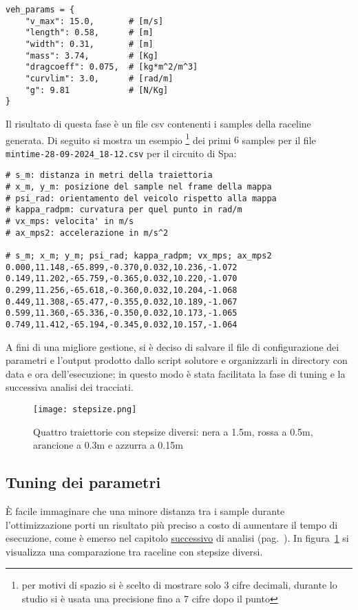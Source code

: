 \begin{lstlisting}
veh_params = {
	"v_max": 15.0,       # [m/s]
	"length": 0.58,      # [m]
	"width": 0.31,       # [m]
	"mass": 3.74,        # [Kg]
	"dragcoeff": 0.075,  # [kg*m^2/m^3]
	"curvlim": 3.0,      # [rad/m]
	"g": 9.81            # [N/Kg]
}
\end{lstlisting}
\newpage
\noindent Il risultato di questa fase è un file csv contenenti i samples della raceline generata. Di seguito si
mostra un esempio \footnote{per motivi di spazio si è scelto di mostrare solo 3 cifre decimali, durante
lo studio si è usata una precisione fino a 7 cifre dopo il punto} dei primi $6$ samples per il
file\\\texttt{mintime-28-09-2024\_18-12.csv} per il circuito di Spa:
\begin{lstlisting}
# s_m: distanza in metri della traiettoria
# x_m, y_m: posizione del sample nel frame della mappa
# psi_rad: orientamento del veicolo rispetto alla mappa
# kappa_radpm: curvatura per quel punto in rad/m
# vx_mps: velocita' in m/s
# ax_mps2: accelerazione in m/s^2

# s_m; x_m; y_m; psi_rad; kappa_radpm; vx_mps; ax_mps2
0.000,11.148,-65.899,-0.370,0.032,10.236,-1.072
0.149,11.202,-65.759,-0.365,0.032,10.220,-1.070
0.299,11.256,-65.618,-0.360,0.032,10.204,-1.068
0.449,11.308,-65.477,-0.355,0.032,10.189,-1.067
0.599,11.360,-65.336,-0.350,0.032,10.173,-1.065
0.749,11.412,-65.194,-0.345,0.032,10.157,-1.064
\end{lstlisting}
A fini di una migliore gestione, si è deciso di salvare il file di configurazione dei parametri e
l'output prodotto dallo script solutore e organizzarli in directory con data e ora dell'esecuzione; in
questo modo è stata facilitata la fase di tuning e la successiva analisi dei tracciati.

\begin{figure}[H]
	\begin{center}
		\texttt{[image: stepsize.png]}
	\end{center}
	\caption{Quattro traiettorie con stepsize diversi: nera a 1.5m, rossa a 0.5m,
	arancione a 0.3m e azzurra a 0.15m}
	\label{fig:stepsize}
\end{figure}

\subsection{Tuning dei parametri}
\label{par:tuning}
È facile immaginare che una minore distanza tra i sample durante l'ottimizzazione porti un risultato più
preciso a costo di aumentare il tempo di esecuzione, come è emerso nel capitolo
\href{sec:exec-time}{successivo} di analisi (pag.~\pageref{sec:exec-time}).
In figura~\ref{fig:stepsize} si visualizza una comparazione tra raceline con stepsize diversi.

